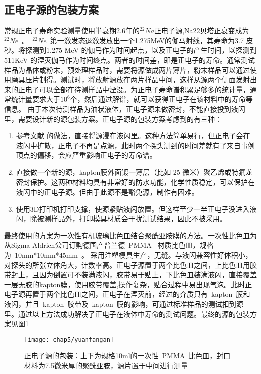 \subsection{正电子源的包装方案}
常规正电子寿命实验测量使用半衰期2.6年的$^{22}Na$正电子源,Na22贝塔正衰变成为~$^{22}Ne$~。~$^{22}Ne$~第一激发态退激发放出一个1.275MeV的伽马射线，其寿命为3.7 皮秒。将探测到1.275 MeV 的伽马作为时间起点，以及正电子的产生时间，以探测到511KeV 的湮灭伽马作为时间终点。两者的时间差，即是正电子的寿命。通常测试样品为晶体或粉末，预处理样品时，需要将源做成两片薄片，粉末样品可以通过使用磨具压片制得。测试时，将放射源放在两片样品中间，这样从源两个侧面发射出来的正电子可以全部在待测样品中湮没。为正电子寿命谱积累足够多的统计量，通常统计量要求大于$10^{6}$个，然后通过解谱，就可以获得正电子在该材料中的寿命等信息。
由于本次待测样品为油状液体，正电子源未做密封，不能直接投到液闪里，需要设计新的源包装方案。正电子源的包装方案考虑到的有三种：
\begin{enumerate}
\item 参考文献\citep{franco2011positronium} 的做法，直接将源浸在液闪里。这种方法简单易行，但正电子会在液闪中扩散，正电子不再是点源，此时两个探头测到的时间差就有了来自事例顶点的偏移，会应严重影响正电子的寿命谱。
\item 直接做一个新的源，kapton膜外面镀一薄层（比如 25 微米）聚乙烯或特氟龙密封保护。这两种材料均具有非常好的防水功能，化学性质稳定，可以保护在液闪中的正电子源。但由于此源不是豁免源，制作有困难。
\item 使用3D打印机打印支撑，使源紧贴液闪放置。但这样至少一半正电子没进入液闪，除被测样品外，打印模具材质会干扰测试结果，因此不被采用。
\end{enumerate}
最终使用的方案为一次性有机玻璃比色皿结合聚酰亚胺膜的方法。一次性比色皿为从Sigma-Aldrich公司订购德国产普兰德~PMMA~ 材质比色皿，规格为~10mm*10mm*45mm~。 采用注塑模具生产，无缝。与液闪兼容性好体积小，对探头的所张立体角大，计数率高。正电子源置于两个比色皿之间，上比色皿用胶带封上，且因为倒置可不装满液闪，胶带易于贴上，下比色皿装满液闪，直接覆盖一层无胶的kapton膜，使用胶带覆盖,操作复杂，贴合过程中易出现气泡。此时正电子源再置于两个比色皿之间，正电子在湮灭前，经过的介质只有~kapton~膜和液闪，并且~kapton~胶带及~kapton~膜的影响，可通过标准样品的测试扣到源里。通过以上方法成功解决了正电子在液体中寿命的测试问题。最终的源的包装方案见图\ref{fig:p53}
\begin{figure}[!htbp]
  \centering
  \texttt{[image: chap5/yuanfangan]}
  \caption{正电子源的包装：上下为规格10ml的一次性~PMMA~比色皿，封口材料为7.5微米厚的聚酰亚胺，源片置于中间进行测量}
  \label{fig:p53}
\end{figure}
